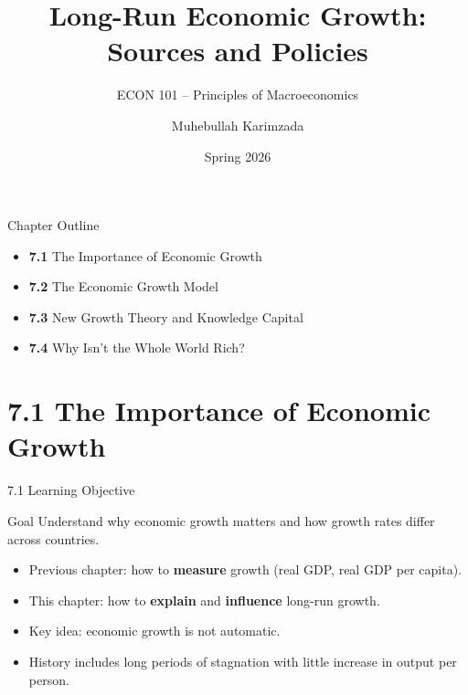\documentclass[aspectratio=169]{beamer}
\title{\textbf{Long-Run Economic Growth: Sources and Policies}}
\subtitle{{\large ECON 101 -- Principles of Macroeconomics}}
\author{Muhebullah Karimzada}
\date{Spring 2026}
\begin{document}

\begin{frame}[plain]
  \titlepage
\end{frame}

\begin{frame}{Chapter Outline}
\transfade
\begin{itemize}
  \item \textbf{7.1} The Importance of Economic Growth
  \item \textbf{7.2} The Economic Growth Model
  \item \textbf{7.3} New Growth Theory and Knowledge Capital
  \item \textbf{7.4} Why Isn't the Whole World Rich?
\end{itemize}
\end{frame}

\section{7.1 The Importance of Economic Growth}

\begin{frame}{7.1 Learning Objective}
\transfade
\begin{block}{Goal}
Understand why economic growth matters and how growth rates differ across countries.
\end{block}
\begin{itemize}
  \item Previous chapter: how to \textbf{measure} growth (real GDP, real GDP per capita).
  \item This chapter: how to \textbf{explain} and \textbf{influence} long-run growth.
  \item Key idea: economic growth is \alert{not automatic}.
  \item History includes long periods of stagnation with little increase in output per person.
\end{itemize}
\end{frame}
\end{document}
